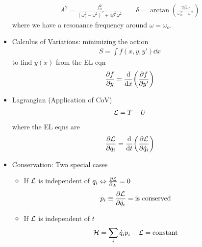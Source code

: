 \documentclass[../main.tex]{subfiles}
\begin{document}
\begin{itemize}
    \begin{align*}
        A^2 = \frac{f_0^2}{(\omega_o^2 - \omega^2)^2 + 4\beta^2 \omega^2} \qquad 
        \delta = \arctan(\frac{2\beta \omega}{\omega_o^2 - \omega^2})
    \end{align*}
    where we have a resonance frequency around $\omega = \omega_o$.
    \item Calculus of Variations: minimizing the action
    \begin{align*}
        S = \int f(x, y, y') \dd x
    \end{align*}
    to find $y(x)$ from the EL eqn
    \begin{align*}
        \pdv{f}{y} = \dv{x}(\pdv{f}{y'})
    \end{align*}
    \item Lagrangian (Application of CoV)
    \begin{align*}
        \mathcal{L} = T - U
    \end{align*}
    where the EL eqns are
    \begin{align*}
        \pdv{\mathcal{L}}{q_i} = \dv{t}(\pdv{\mathcal{L}}{\dot q_i})
    \end{align*}
    \item Conservation: Two special cases
    \begin{itemize}
        \item If $\mathcal{L}$ is independent of $q_i \Leftrightarrow \pdv{\mathcal{L}}{q_i} = 0$
        \begin{align*}
            p_i \equiv \pdv{\mathcal{L}}{\dot q_i} = \text{is conserved}
        \end{align*}
        \item If $\mathcal{L}$ is independent of $t$
        \begin{align*}
            \mathcal H = \sum_i \dot q_i p_i - \mathcal{L} = \text{constant}
        \end{align*}
    \end{itemize}
\end{itemize}
\end{document}
